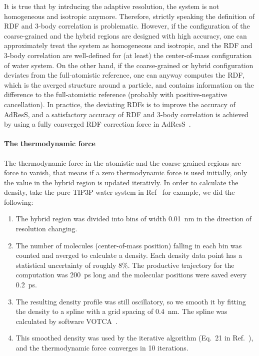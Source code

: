 \documentclass[epjST]{svjour}
\begin{document}
It is true that by intrducing the adaptive resolution, the system is not homogeneous
and isotropic anymore. Therefore, strictly speaking the definition
of RDF and 3-body correlation is problematic. However, if the configuration
of the coarse-grained and the
hybrid regions are designed with high accuracy, one can approximately
treat the system as homogeneous and isotropic, and the RDF and 3-body correlation
are well-defined for (at least) the center-of-mass configuration of water system.
On the other hand, if the coarse-grained or hybrid
configuration deviates from the full-atomistic reference,
one can anyway computes the RDF,
which is the averged structure around a particle, and contains information on
the difference to the
full-atomistic reference (probably with positive-negative cancellation).
In practice,
the deviating RDFs is to improve the accuracy of AdResS, and a
satisfactory accuracy of RDF and 3-body correlation is achieved by
using a fully converged RDF correction force in
AdResS~\cite{wang2012adaptive,wang2013grand}.


\paragraph{The thermodynamic force}
The thermodynamic force in the atomistic and the coarse-grained
regions are force to vanish, that means if a zero thermodynamic force
is used initially, only the value in the hybrid region is updated
iterativly. In order to calculate the density,
take the pure TIP3P water system in Ref~\cite{wang2015adaptive}
for example, we did the following:
\begin{enumerate}
\item The hybrid region was divided into bins of width 0.01~nm in the
  direction of resolution changing.
\item The number of molecules (center-of-mass position) falling in
  each bin was counted and averged to calculate a density. Each density data point
  has a statistical uncertainty of roughly 8\%.
  The productive trajectory for the computation was 200~ps long
  and the molecular positions were saved every 0.2~ps.
\item The resulting density profile was still oscillatory,
  so we smooth it by fitting the density
  to a  spline with a grid spacing of 0.4~nm.
  The spline was calculated by software VOTCA~\cite{ruehle2009versatile}.
\item This smoothed density was used
  by the iterative algorithm (Eq.~21 in Ref.~\cite{wang2015adaptive}),
  and the thermodynamic force converges in 10 iterations.
\end{enumerate}
\end{document}
